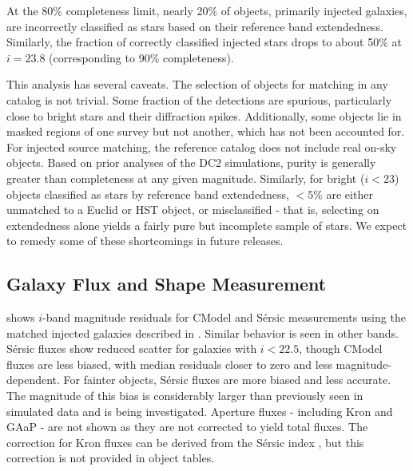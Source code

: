 At the 80\% completeness limit, nearly 20\% of objects, primarily injected galaxies, are incorrectly classified as stars based on their reference band extendedness.
Similarly, the fraction of correctly classified injected stars drops to about 50\% at $i=23.8$ (corresponding to 90\% completeness).

This analysis has several caveats.
The selection of objects for matching in any catalog is not trivial.
Some fraction of the detections are spurious, particularly close to bright stars and their diffraction spikes.
Additionally, some objects lie in masked regions of one survey but not another, which has not been accounted for. 
For injected source matching, the reference catalog does not include real on-sky objects.
Based on prior analyses of the \gls{DC2} simulations, purity is generally greater than completeness at any given magnitude.
Similarly, for bright ($i<23$) objects classified as stars by reference band extendedness, $<5\%$ are either unmatched to a Euclid or HST object, or misclassified - that is, selecting on extendedness alone yields a fairly pure but incomplete sample of stars.
We expect to remedy some of these shortcomings in future releases.

\subsection{Galaxy Flux and Shape Measurement}
\label{ssec:fluxes}

 shows $i$-band magnitude residuals for CModel and S\'ersic measurements using the matched injected galaxies described in .
Similar behavior is seen in other bands.
S\'ersic fluxes show reduced scatter for galaxies with $i<22.5$, though CModel fluxes are less biased, with median residuals closer to zero and less magnitude-dependent.
For fainter objects, S\'ersic fluxes are more biased and less accurate.
The magnitude of this bias is considerably larger than previously seen in simulated data and is being investigated.
Aperture fluxes - including Kron and \gls{GAaP} - are not shown as they are not corrected to yield total fluxes.
The correction for Kron fluxes can be derived from the S\'ersic index \citep{2005PASA...22..118G}, but this correction is not provided in object tables.

